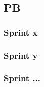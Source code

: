 \documentclass{article}
\begin{document}
        \subsection{PB}
            \subsubsection{Sprint x}
            \subsubsection{Sprint y}
            \subsubsection{Sprint ...}

\end{document}
